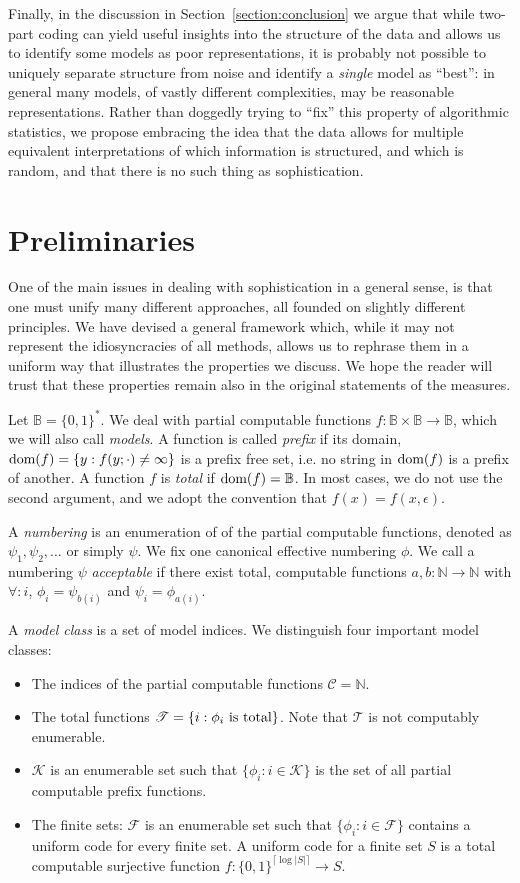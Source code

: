 \documentclass{style/llncs}
\newcommand{\C}{\mathscr C}
\newcommand{\T}{\mathscr T}
\newcommand{\F}{\mathscr F}
\newcommand{\K}{\mathscr K}
\newcommand{\B}{\mathbb B}
\newcommand{\N}{\mathbb N}
\newcommand{\tn}[1]{\textnormal{#1}}
\newcommand{\dom}[1]{\mathop{\tn{dom}(#1)}}
\begin{document}
Finally, in the discussion in Section~\ref{section:conclusion} we argue that while two-part coding can yield useful insights into the structure of the data and allows us to identify some models as poor representations, it is probably not possible to uniquely separate structure from noise and identify a \emph{single} model as ``best'': in general many models, of vastly different complexities, may be reasonable representations. Rather than doggedly trying to ``fix'' this property of algorithmic statistics, we propose embracing the idea that the data allows for multiple equivalent interpretations of which information is structured, and which is random, and that there is no such thing as sophistication.

\section{Preliminaries}
One of the main issues in dealing with sophistication in a general sense, is that one must unify many different approaches, all founded on slightly different principles. We have devised a general framework which, while it may not represent the idiosyncracies of all methods, allows us to rephrase them in a uniform way that illustrates the properties we discuss. We hope the reader will trust that these properties remain also in the original statements of the measures.

Let $\B = \{0,1\}^*$. We deal with partial computable functions $f: \B \times \B \to \B$, which we will also call \emph{models}. A function is called \emph{prefix} if its domain, $\dom{f} = \{y : f(y; \cdot) \neq \infty\}$ is a prefix free set, i.e. no string in $\dom{f}$ is a prefix of another. A function $f$ is \emph{total} if $\dom{f} = \B$. In most cases, we do not use the second argument, and we adopt the convention that $f(x) = f(x, \epsilon)$.

A \emph{numbering} is an enumeration of of the partial computable functions, denoted as $\psi_1, \psi_2, \ldots$ or simply $\psi$. We fix one canonical effective numbering $\phi$. We call a numbering $\psi$ \emph{acceptable} if there exist total, computable functions $a, b: \N \to \N$ with $\forall: i$, $\phi_i = \psi_{b(i)}$ and  $\psi_i = \phi_{a(i)}$.

A \emph{model class} is a set of model indices. We distinguish four important model classes:
\begin{itemize} 
  \item The indices of the partial computable functions $\C=\N$.
  \item The total functions $\T=\{i:\tn{$\phi_i$ is total}\}$. Note that $\T$ is not computably enumerable.
  \item $\K$ is an enumerable set such that $\{\phi_i:i\in\K\}$ is the set of all partial computable prefix functions.
  \item The finite sets: $\F$ is an enumerable set such that $\{\phi_i:i\in\F\}$ contains a uniform code for every finite set. A uniform code for a finite set $S$ is a total computable surjective function $f:\{0,1\}^{\lceil\log|S|\rceil}\to S$.
\end{itemize}
\end{document}
